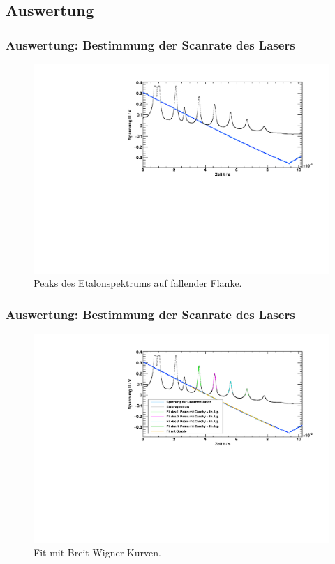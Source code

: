 \subsection{Auswertung}
\begin{frame}
\frametitle{Auswertung: Bestimmung der Scanrate des Lasers}
\begin{figure}
    \centering
    \includegraphics[width=\textwidth]{../img/down-etalon_zoom.pdf} %
    \caption{Peaks des Etalonspektrums auf fallender Flanke.}
\end{figure}
\end{frame}


\begin{frame}
\frametitle{Auswertung: Bestimmung der Scanrate des Lasers}
\begin{figure}
    \centering
    \includegraphics[width=\textwidth]{../img/down-etalon_zoom_fit.pdf}
    \caption{Fit mit Breit-Wigner-Kurven.}
\end{figure}
\end{frame}

